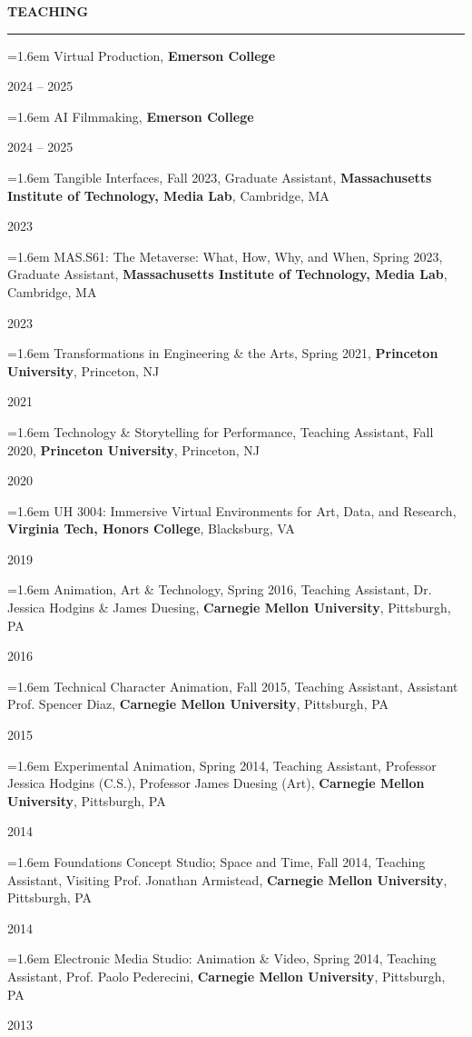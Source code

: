 \documentclass[10pt,letterpaper]{article}
\newcommand{\cvsection}[1]{%
  \par\addvspace{7pt}%
  {\large\bfseries\MakeUppercase{#1}}\par\nobreak
  \vspace{-0.55\baselineskip}\rule{\linewidth}{0.6pt}\par\nobreak\vspace{1.5pt}}
\newlength{\yw}\setlength{\yw}{0.78in}
\newcommand{\yitem}[2]{%
  \par\noindent\parbox[t]{\dimexpr\linewidth-\yw}{\raggedright\hangindent=1.6em\hangafter=1 #1\strut}%
  \hfill #2\par}
\begin{document}
\cvsection{Teaching}
\yitem{Virtual Production, \textbf{Emerson College}}{2024 -- 2025}
\yitem{AI Filmmaking, \textbf{Emerson College}}{2024 -- 2025}
\yitem{Tangible Interfaces, Fall 2023, Graduate Assistant, \textbf{Massachusetts Institute of Technology, Media Lab}, Cambridge, MA}{2023}
\yitem{MAS.S61: The Metaverse: What, How, Why, and When, Spring 2023, Graduate Assistant, \textbf{Massachusetts Institute of Technology, Media Lab}, Cambridge, MA}{2023}
\yitem{Transformations in Engineering \& the Arts, Spring 2021, \textbf{Princeton University}, Princeton, NJ}{2021}
\yitem{Technology \& Storytelling for Performance, Teaching Assistant, Fall 2020, \textbf{Princeton University}, Princeton, NJ}{2020}
\yitem{UH 3004: Immersive Virtual Environments for Art, Data, and Research, \textbf{Virginia Tech, Honors College}, Blacksburg, VA}{2019}
\yitem{Animation, Art \& Technology, Spring 2016, Teaching Assistant, Dr. Jessica Hodgins \& James Duesing, \textbf{Carnegie Mellon University}, Pittsburgh, PA}{2016}
\yitem{Technical Character Animation, Fall 2015, Teaching Assistant, Assistant Prof. Spencer Diaz, \textbf{Carnegie Mellon University}, Pittsburgh, PA}{2015}
\yitem{Experimental Animation, Spring 2014, Teaching Assistant, Professor Jessica Hodgins (C.S.), Professor James Duesing (Art), \textbf{Carnegie Mellon University}, Pittsburgh, PA}{2014}
\yitem{Foundations Concept Studio; Space and Time, Fall 2014, Teaching Assistant, Visiting Prof. Jonathan Armistead, \textbf{Carnegie Mellon University}, Pittsburgh, PA}{2014}
\yitem{Electronic Media Studio: Animation \& Video, Spring 2014, Teaching Assistant, Prof. Paolo Pederecini, \textbf{Carnegie Mellon University}, Pittsburgh, PA}{2013}
\end{document}
